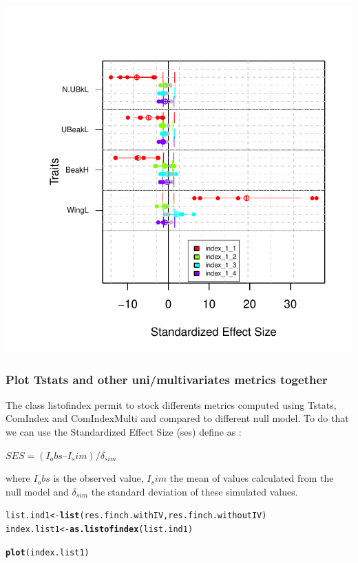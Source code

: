 \documentclass[12pt]{article}\usepackage[]{graphicx}\usepackage[]{color}
\makeatletter
\def\maxwidth{ %
  \ifdim\Gin@nat@width>\linewidth
    \linewidth
  \else
    \Gin@nat@width
  \fi
}
\newcommand{\hlstd}[1]{\textcolor[rgb]{0.345,0.345,0.345}{#1}}%
\newcommand{\hlkwb}[1]{\textcolor[rgb]{0.69,0.353,0.396}{#1}}%
\newcommand{\hlkwd}[1]{\textcolor[rgb]{0.737,0.353,0.396}{\textbf{#1}}}%
\newenvironment{kframe}{%
 \def\at@end@of@kframe{}%
 \ifinner\ifhmode%
  \def\at@end@of@kframe{\end{minipage}}%
  \begin{minipage}{\columnwidth}%
 \fi\fi%
 \def\FrameCommand##1{\hskip\@totalleftmargin \hskip-\fboxsep
 \colorbox{shadecolor}{##1}\hskip-\fboxsep
     \hskip-\linewidth \hskip-\@totalleftmargin \hskip\columnwidth}%
 \MakeFramed {\advance\hsize-\width
   \@totalleftmargin\z@ \linewidth\hsize
   \@setminipage}}%
 {\par\unskip\endMakeFramed%
 \at@end@of@kframe}
\newenvironment{knitrout}{}{} %
\makeatother
\begin{document}
\begin{knitrout}
\includegraphics[width=\maxwidth]{figure/unnamed-chunk-392} 

\end{knitrout}


\subsubsection{Plot Tstats and other uni/multivariates metrics together}
The class listofindex permit to stock differents metrics computed using Tstats, ComIndex and ComIndexMulti and compared to different null model. To do that we can use the Standardized Effect Size (ses) define as : 

\begin{center}
$SES = (I_obs – I_sim) / \delta_{sim}$
\end{center}

where $I_obs$ is the observed value, $I_sim$ the mean of values calculated from the null model and $\delta_{sim}$ the standard deviation of these simulated values.


\begin{knitrout}
\color{fgcolor}\begin{kframe}
\begin{alltt}
\hlstd{list.ind1}\hlkwb{<-}\hlkwd{list}\hlstd{(res.finch.withIV, res.finch.withoutIV)}
\hlstd{index.list1}\hlkwb{<-}\hlkwd{as.listofindex}\hlstd{(list.ind1)}

\hlkwd{plot}\hlstd{(index.list1)}
\end{alltt}
\end{kframe}
\end{knitrout}
\end{document}
